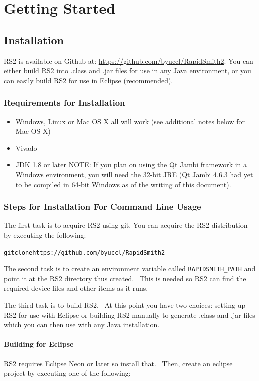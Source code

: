 \documentclass[12pt]{article}
\newcommand{\env}[1]{{\texttt{#1}}}
\newenvironment{code}{\begin{center} \begin{minipage}{6in} \noindent \begin{alltt}}{\end{alltt} \end{minipage} \end{center}}
\begin{document}
\section{Getting Started}

\subsection{Installation}

RS2 is available on Github at: \url{https://github.com/byuccl/RapidSmith2}.  
You can either build RS2 into .class and .jar files for use in any Java
environment, or you can easily build RS2 for use in Eclipse (recommended).

\subsubsection{Requirements for Installation}
\begin{itemize}
  \item Windows, Linux or Mac OS X all will work (see additional notes below for
  Mac OS X)
  \item Vivado
  \item JDK 1.8 or later NOTE: If you plan on using the Qt Jambi framework in a
  Windows environment, you will need the 32-bit JRE (Qt Jambi 4.6.3 had yet to
  be compiled in 64-bit Windows as of the writing of this document).
\end{itemize}
 
\subsubsection{Steps for Installation For Command Line Usage}
The first task is to acquire RS2 using git.
You can acquire the RS2 distribution by executing the following: 
\vspace{-0.15in}  \begin{code}
git clone https://github.com/byuccl/RapidSmith2
\end{code} 
The second task is to create an environment variable called
\env{RAPIDSMITH\_PATH} and point it at the RS2 directory thus created.  This is
needed so RS2 can find the required device files and other items as it runs.

The third task is to build RS2.  At this point you have two choices: setting up
RS2 for use with Eclipse or building RS2 manually to generate
.class and .jar files which you can then use with any Java installation.
	
\paragraph{Building for Eclipse}  
RS2 requires Eclipse Neon or later so install that. 
Then, create an eclipse project by executing one of the following:
\end{document}
